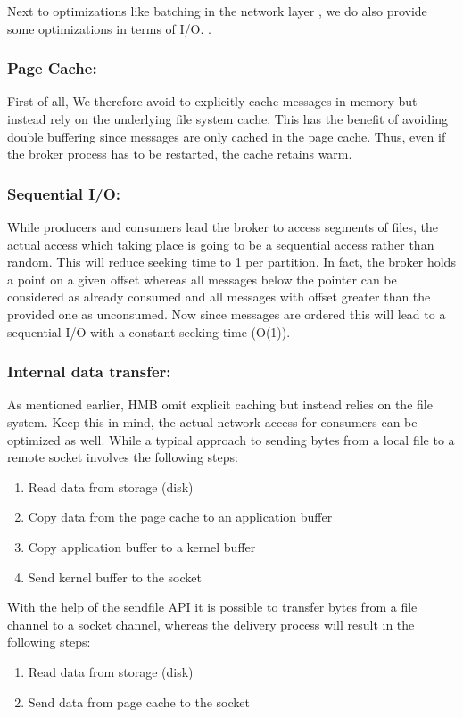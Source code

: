 Next to optimizations like batching in the network layer ,
we do also provide some optimizations in terms of I/O. .

\subsubsection{Page Cache:}

First of all, We therefore avoid to explicitly cache messages in memory but
instead rely on the underlying file system cache. This has the benefit of
avoiding double buffering since messages are only cached in the page cache.
Thus, even if the broker process has to be restarted, the cache retains warm.


\subsubsection{Sequential I/O: }

While producers and consumers lead the broker to access
segments of files, the actual access which taking place is going to be a
sequential access rather than random. This will reduce seeking time to 1 per
partition. In fact, the broker holds a point on a given offset whereas all
messages below the pointer can be considered as already consumed and all
messages with offset greater than the provided one as unconsumed. Now since
messages are ordered this will lead to a sequential I/O with a constant seeking
time (O(1)).


\subsubsection{Internal data transfer:}

As mentioned earlier, HMB omit explicit caching but instead relies on the file system.
Keep this in mind, the actual network access for consumers can be optimized as well.
While a typical approach to sending bytes from a local file to a remote
socket involves the following steps: 
\begin{enumerate}
  \item Read data from storage (disk)
  \item Copy data from the page cache to an application buffer
  \item Copy application buffer to a kernel buffer
  \item Send kernel buffer to the socket
\end{enumerate}

With the help of the sendfile API  it is possible to transfer bytes
from a file channel to a socket channel, whereas the delivery process will
result in the following steps:

\begin{enumerate}
  \item Read data from storage (disk)
  \item Send data from page cache to the socket
\end{enumerate}
